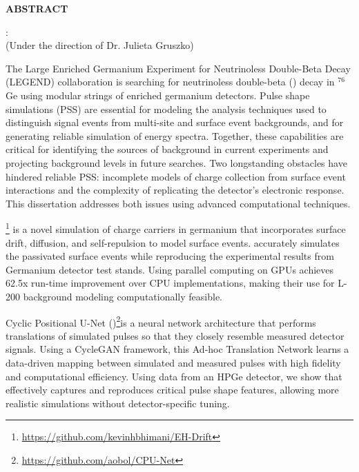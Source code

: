 \begin{center}
\vspace*{52pt}
{\normalfont\textbf{ABSTRACT}}
\vspace{11pt}

\begin{singlespace}
{\authorname}: {\thesistitle}\\
(Under the direction of Dr. Julieta Gruszko)
\end{singlespace}
\end{center}
The Large Enriched Germanium Experiment for Neutrinoless Double-Beta Decay (LEGEND) collaboration is searching for neutrinoless double-beta ({\onbb}) decay in ${}^{76}$Ge using modular strings of enriched germanium detectors. Pulse shape simulations (PSS) are essential for modeling the analysis techniques used to distinguish signal events from multi-site and surface event backgrounds, and for generating reliable simulation of energy spectra. Together, these capabilities are critical for identifying the sources of background in current experiments and projecting background levels in future searches. Two longstanding obstacles have hindered reliable PSS: incomplete models of charge collection from surface event interactions and the complexity of replicating the detector’s electronic response. This dissertation addresses both issues using advanced computational techniques.

{\ehd}\footnote{\url{https://github.com/kevinhbhimani/EH-Drift}} is a novel simulation of charge carriers in germanium that incorporates surface drift, diffusion, and self-repulsion to model surface events. {\ehd} accurately simulates the passivated surface events while reproducing the experimental results from Germanium detector test stands. Using parallel computing on GPUs {\ehd} achieves 62.5x run-time improvement over CPU implementations, making their use for L-200 background modeling computationally feasible.

Cyclic Positional U-Net ({\cpunet})\footnote{\url{https://github.com/aobol/CPU-Net}}is a neural network architecture that performs translations of simulated pulses so that they closely resemble measured detector signals. Using a CycleGAN framework, this Ad-hoc Translation Network learns a data-driven mapping between simulated and measured pulses with high fidelity and computational efficiency. Using data from an HPGe detector, we show that {\cpunet} effectively captures and reproduces critical pulse shape features, allowing more realistic simulations without detector-specific tuning.